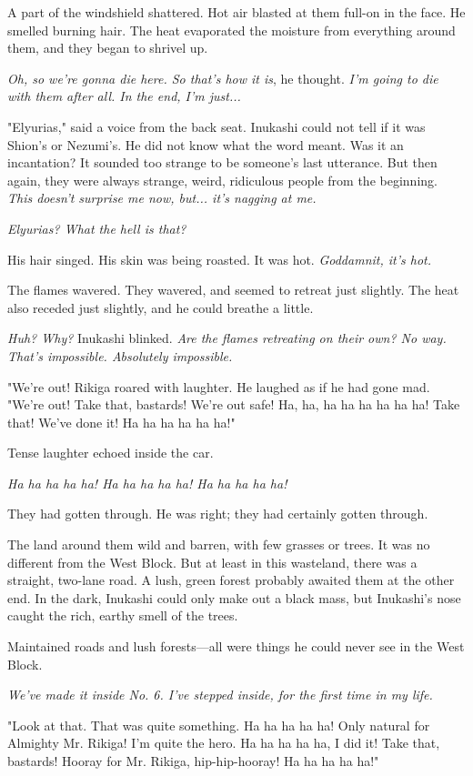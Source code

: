A part of the windshield shattered. Hot air blasted at them full-on in
the face. He smelled burning hair. The heat evaporated the moisture from
everything around them, and they began to shrivel up.

\emph{Oh, so we're gonna die here. So that's how it is}, he thought. \emph{I'm going
to die with them after all. In the end, I'm just...}

"Elyurias," said a voice from the back seat. Inukashi could not tell if
it was Shion's or Nezumi's. He did not know what the word meant. Was it
an incantation? It sounded too strange to be someone's last utterance.
But then again, they were always strange, weird, ridiculous people from
the beginning. \emph{This doesn't surprise me now, but... it's nagging at me.}

\emph{Elyurias? What the hell is that?}

His hair singed. His skin was being roasted. It was hot. \emph{Goddamnit, it's
hot.}

The flames wavered. They wavered, and seemed to retreat just slightly.
The heat also receded just slightly, and he could breathe a little.

\emph{Huh? Why?} Inukashi blinked. \emph{Are the flames retreating on their own? No
way. That's impossible. Absolutely impossible.}

"We're out! Rikiga roared with laughter. He laughed as if he had gone
mad. "We're out! Take that, bastards! We're out safe! Ha, ha, ha ha ha
ha ha ha! Take that! We've done it! Ha ha ha ha ha ha!"

Tense laughter echoed inside the car.

\emph{Ha ha ha ha ha! Ha ha ha ha ha! Ha ha ha ha ha!}

They had gotten through. He was right; they had certainly gotten
through.

The land around them wild and barren, with few grasses or trees. It was
no different from the West Block. But at least in this wasteland, there
was a straight, two-lane road. A lush, green forest probably awaited
them at the other end. In the dark, Inukashi could only make out a black
mass, but Inukashi's nose caught the rich, earthy smell of the trees.

Maintained roads and lush forests---all were things he could never see in
the West Block.

\emph{We've made it inside No. 6. I've stepped inside, for the first time in
my life.}

"Look at that. That was quite something. Ha ha ha ha ha! Only natural
for Almighty Mr. Rikiga! I'm quite the hero. Ha ha ha ha ha, I did it!
Take that, bastards! Hooray for Mr. Rikiga, hip-hip-hooray! Ha ha ha ha
ha!"

